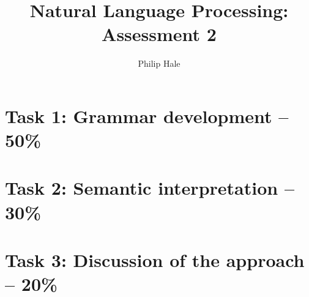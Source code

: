 \documentclass{article}
\author{Philip Hale}
\title{Natural Language Processing: Assessment 2}
\begin{document}
\maketitle

\tableofcontents

\section{Task 1: Grammar development – 50\%}

\section{Task 2: Semantic interpretation – 30\%}

\section{Task 3: Discussion of the approach – 20\%}
\end{document}
